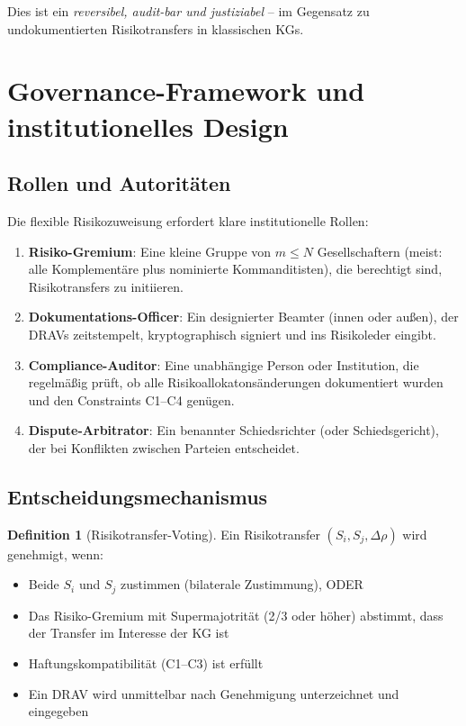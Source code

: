 \documentclass[a4paper, 12pt, twoside, openright]{report}
\theoremstyle{definition}
\newtheorem{definition}[theorem]{Definition}
\theoremstyle{definition}
\begin{document}
Dies ist ein \emph{reversibel, audit-bar und justiziabel} -- im Gegensatz zu undokumentierten Risikotransfers in klassischen KGs.

\section{Governance-Framework und institutionelles Design}

\subsection{Rollen und Autoritäten}

Die flexible Risikozuweisung erfordert klare institutionelle Rollen:

\begin{enumerate}
    \item \textbf{Risiko-Gremium}: Eine kleine Gruppe von $m \leq N$ Gesellschaftern (meist: alle Komplementäre plus nominierte Kommanditisten), die berechtigt sind, Risikotransfers zu initiieren.
    
    \item \textbf{Dokumentations-Officer}: Ein designierter Beamter (innen oder außen), der DRAVs zeitstempelt, kryptographisch signiert und ins Risikoleder eingibt.
    
    \item \textbf{Compliance-Auditor}: Eine unabhängige Person oder Institution, die regelmäßig prüft, ob alle Risikoallokatonsänderungen dokumentiert wurden und den Constraints C1--C4 genügen.
    
    \item \textbf{Dispute-Arbitrator}: Ein benannter Schiedsrichter (oder Schiedsgericht), der bei Konflikten zwischen Parteien entscheidet.
\end{enumerate}

\subsection{Entscheidungsmechanismus}

\begin{definition}[Risikotransfer-Voting]
Ein Risikotransfer $(S_i, S_j, \Delta\rho)$ wird genehmigt, wenn:
\begin{itemize}
    \item Beide $S_i$ und $S_j$ zustimmen (bilaterale Zustimmung), ODER
    \item Das Risiko-Gremium mit Supermajotrität (2/3 oder höher) abstimmt, dass der Transfer im Interesse der KG ist
    \item Haftungskompatibilität (C1--C3) ist erfüllt
    \item Ein DRAV wird unmittelbar nach Genehmigung unterzeichnet und eingegeben
\end{itemize}
\end{definition}
\end{document}

